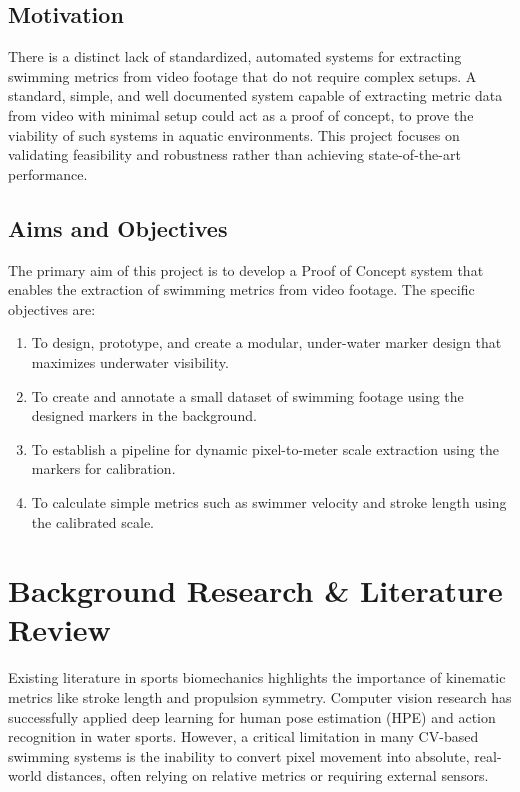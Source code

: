 \documentclass[conference]{IEEEtran}
\begin{document}
\subsection{Motivation}
There is a distinct lack of standardized, automated systems for extracting swimming metrics from video footage that do not require complex setups.
A standard, simple, and well documented system capable of extracting metric data from video with minimal setup could act as a proof of concept, to prove the viability of such systems in aquatic environments. This project focuses on validating feasibility and robustness rather than achieving state-of-the-art performance.

\subsection{Aims and Objectives}
The primary aim of this project is to develop a Proof of Concept system that enables the extraction of swimming metrics from video footage. The specific objectives are:
\begin{enumerate}
    \item To design, prototype, and create a modular, under-water marker design that maximizes underwater visibility.
    \item To create and annotate a small dataset of swimming footage using the designed markers in the background.
    \item To establish a pipeline for dynamic pixel-to-meter scale extraction using the markers for calibration.
    \item To calculate simple metrics such as swimmer velocity and stroke length using the calibrated scale. %
\end{enumerate}

\section{Background Research \& Literature Review}

Existing literature in sports biomechanics highlights the importance of kinematic metrics like stroke length and propulsion symmetry. Computer vision research has successfully applied deep learning for human pose estimation (HPE) and action recognition in water sports. However, a critical limitation in many CV-based swimming systems is the inability to convert pixel movement into absolute, real-world distances, often relying on relative metrics or requiring external sensors.
\end{document}
